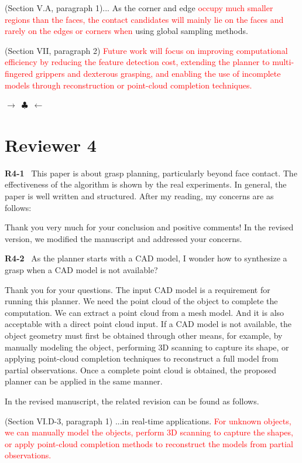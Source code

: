 \documentclass[journal]{IEEEtran}
\newcommand{\rev}[1]{\textcolor{red}{#1}}
\newcommand{\ornamentbreak}{%
\begin{center}
    $\longrightarrow$~$\clubsuit$~$\longleftarrow$
  \end{center}
}
\begin{document}
(Section V.A, paragraph 1)...
As the corner and edge \rev{occupy much smaller regions than the faces, the contact candidates will mainly lie on the faces and rarely on the edges or corners when} using global sampling methods.

(Section VII, paragraph 2)
\rev{Future work will focus on improving computational efficiency by reducing the feature detection cost, extending the planner to multi-fingered grippers and dexterous grasping, and enabling the use of incomplete models through reconstruction or point-cloud completion techniques.}
\bigskip

\ornamentbreak
\section{Reviewer 4}
{\textbf{\color{black}R4-1}\color{gray}~
This paper is about grasp planning, particularly beyond face contact.
The effectiveness of the algorithm is shown by the real experiments. In general, the paper is well written and structured. After my reading, my concerns are as follows:
}

Thank you very much for your conclusion and positive comments! In the revised version, we modified the manuscript and addressed your concerns.
\bigskip

\noindent
{\textbf{\color{black}R4-2}\color{gray}~
As the planner starts with a CAD model, I wonder how to synthesize a grasp when a CAD model is not available?
}

Thank you for your questions. The input CAD model is a requirement for running this planner. We need the point cloud of the object to complete the computation. We can extract a point cloud from a mesh model. And it is also acceptable with a direct point cloud input. 
If a CAD model is not available, the object geometry must first be obtained through other means, for example, by manually modeling the object, performing 3D scanning to capture its shape, or applying point-cloud completion techniques to reconstruct a full model from partial observations. Once a complete point cloud is obtained, the proposed planner can be applied in the same manner.

In the revised manuscript, the related revision can be found as follows.

(Section VI.D-3, paragraph 1) 
...in real-time applications. 
\rev{For unknown objects, we can manually model the objects, perform 3D scanning to capture the shapes, or apply point-cloud completion methods to reconstruct the models from partial observations.}
\bigskip
\end{document}

